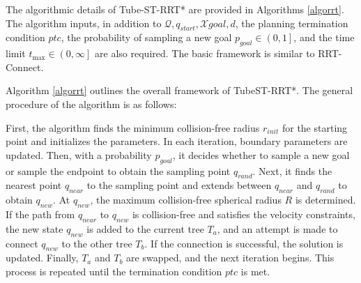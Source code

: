 \documentclass[conference]{IEEEtran}
\begin{document}
    The algorithmic details of Tube-ST-RRT* are provided in Algorithms \ref{algorrt}. The algorithm inputs, in addition to $\mathcal{Q}, q_{start}, \mathcal{X}{goal}, d$, the planning termination condition $ptc$, the probability of sampling a new goal $p_{goal} \in \left (0, 1 \right ]$, and the time limit $t_{\max} \in \left (0, \infty \right]$ are also required. The basic framework is similar to RRT-Connect.

    Algorithm \ref{algorrt} outlines the overall framework of TubeST-RRT*. The general procedure of the algorithm is as follows:
    
    First, the algorithm finds the minimum collision-free radius \( r_{init} \) for the starting point and initializes the parameters. In each iteration, boundary parameters are updated. Then, with a probability \( p_{goal} \), it decides whether to sample a new goal or sample the endpoint to obtain the sampling point \( q_{rand} \). Next, it finds the nearest point \( q_{near} \) to the sampling point and extends between \( q_{near} \) and \( q_{rand} \) to obtain \( q_{new} \). At \( q_{new} \), the maximum collision-free spherical radius \( R \) is determined. If the path from \( q_{near} \) to \( q_{new} \) is collision-free and satisfies the velocity constraints, the new state \( q_{new} \) is added to the current tree \( T_{a} \), and an attempt is made to connect \( q_{new} \) to the other tree \( T_{b} \). If the connection is successful, the solution is updated. Finally, \( T_{a} \) and \( T_{b} \) are swapped, and the next iteration begins. This process is repeated until the termination condition \( ptc \) is met.
\end{document}

